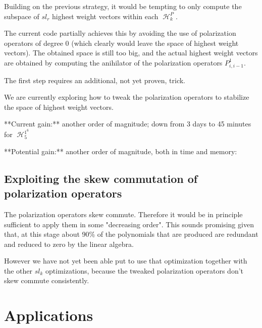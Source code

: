 \documentclass[letter,12pt]{article}
\newcommand{\pauline}[1]{\todo[linecolor=blue,backgroundcolor=blue!25,bordercolor=blue]{#1}}
\DeclareMathOperator{\harmonics}{\mathcal{H}}
\begin{document}
	Building on the previous strategy, it would be tempting to only compute the subspace of $sl_r$ highest weight vectors within each $\harmonics_k^P$.
	
	The current code partially achieves this by avoiding the use of polarization operators of degree $0$ (which clearly would leave the space of highest weight vectors). The obtained space is still too big, and the actual highest weight vectors are obtained by computing the anihilator of the polarization operators $P_{i,i-1}^1$.
	
	The first step requires an additional, not yet proven, trick.
	
	We are currently exploring how to tweak the polarization operators to stabilize the space of highest weight vectors.
	
	**Current gain:** another order of magnitude; down from 3 days to 45 minutes for $\harmonics_5^{1^6}$
	
	**Potential gain:** another order of magnitude, both in time and memory:
	
	\subsection{Exploiting the skew commutation of polarization operators}
	
	The polarization operators skew commute. \pauline{add commutator computation} Therefore it would be in principle sufficient to apply them in some "decreasing order". This sounds promising given that, at this stage about 90\% of the polynomials that are produced are redundant and reduced to zero by the linear algebra.
	
	However we have not yet been able put to use that optimization together with the other $sl_k$ optimizations, because the tweaked polarization operators don't skew commute consistently.
	
	\section{Applications}
	

\nocite{*}

\end{document}
